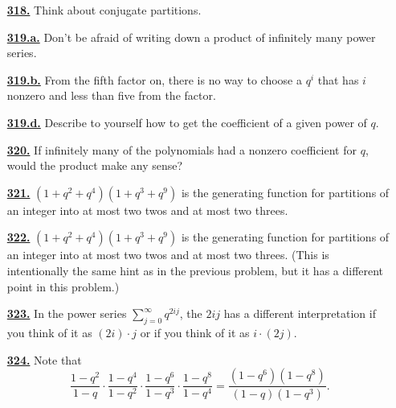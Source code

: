 \documentclass[10pt,]{book}
\theoremstyle{plain}
\theoremstyle{definition}
\theoremstyle{definition}
\theoremstyle{definition}
\numberwithin{equation}{chapter}
\begin{document}
\begin{itemize}[itemsep=1em]
\hypertarget{a-318}{}\item[\textbf{\hyperref[atmostmparts]{318.}}]
\hypertarget{p-1575}{}%
Think about conjugate partitions.%

\hypertarget{a-319.a}{}\item[\textbf{\hyperref[task-271]{319.a.}}]
\hypertarget{p-1579}{}%
Don't be afraid of writing down a product of infinitely many power series.%

\hypertarget{a-319.b}{}\item[\textbf{\hyperref[task-272]{319.b.}}]
\hypertarget{p-1582}{}%
From the fifth factor on, there is no way to choose a \(q^i\) that has \(i\) nonzero and less than five from the factor.%

\hypertarget{a-319.d}{}\item[\textbf{\hyperref[task-274]{319.d.}}]
\hypertarget{p-1587}{}%
Describe to yourself how to get the coefficient of a given power of \(q\).%

\hypertarget{a-320}{}\item[\textbf{\hyperref[activity-313]{320.}}]
\hypertarget{p-1593}{}%
If infinitely many of the polynomials had a nonzero coefficient for \(q\), would the product make any sense?%

\hypertarget{a-321}{}\item[\textbf{\hyperref[activity-314]{321.}}]
\hypertarget{p-1596}{}%
\((1 + q^2 + q^4 )(1 + q^3 + q^9 )\) is the generating function for partitions of an integer into at most two twos and at most two threes.%

\hypertarget{a-322}{}\item[\textbf{\hyperref[activity-315]{322.}}]
\hypertarget{p-1599}{}%
\((1 + q^2 + q^4 )(1 + q^3 + q^9 )\) is the generating function for partitions of an integer into at most two twos and at most two threes. (This is intentionally the same hint as in the previous problem, but it has a different point in this problem.)%

\hypertarget{a-323}{}\item[\textbf{\hyperref[activity-316]{323.}}]
\hypertarget{p-1602}{}%
In the power series \(\sum_{j=0}^\infty q^{2ij}\), the \(2ij\) has a different interpretation if you think of it as \((2i) \cdot j\) or if you think of it as \(i \cdot (2j)\).%

\hypertarget{a-324}{}\item[\textbf{\hyperref[activity-317]{324.}}]
\hypertarget{p-1605}{}%
Note that%
\begin{equation*}
\frac{1-q^2}{1-q}\cdot \frac{1-q^4}{1-q^2}\cdot \frac{1-q^6}{1-q^3}\cdot \frac{1-q^8}{1-q^4} = \frac{(1-q^6)(1-q^8)}{(1-q)(1-q^3)} \text{.}
\end{equation*}
%


\end{itemize}
\end{document}
